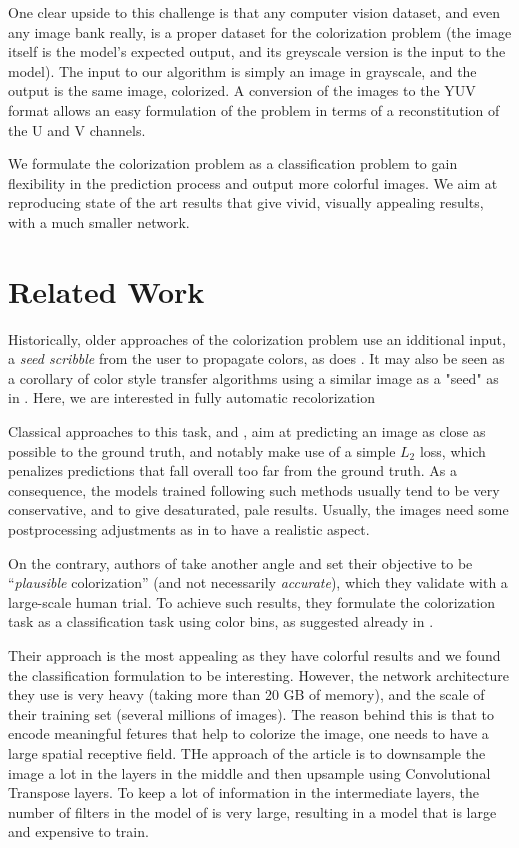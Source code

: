 \documentclass[10pt,twocolumn,letterpaper]{article}
\begin{document}
One clear upside to this challenge is that any computer vision dataset, and even any image bank really, is a proper dataset for the colorization problem (the image itself is the model's expected output, and its greyscale version is the input to the model).
The input to our algorithm is simply an image in grayscale, and the output is the same image, colorized. A conversion of the images to the YUV format allows an easy formulation of the problem in terms of a reconstitution of the U and V channels.

We formulate the colorization problem as a classification problem to gain flexibility in the prediction process and output more colorful images. We aim at reproducing state of the art results that give vivid, visually appealing results, with a much smaller network.

\section{Related Work} \label{relatedwork}

Historically, older approaches of the colorization problem use an idditional input, a \textit{seed scribble} from the user to propagate colors, as does \cite{levin2004colorization}. It may also be seen as a corollary of color style transfer algorithms using a similar image as a "seed" as in \cite{he2017neuralct}. Here, we are interested in fully automatic recolorization

Classical approaches to this task, \eg \cite{cheng2015deep} and \cite{dahl2016tinyclouds}, aim at predicting an image as close as possible to the ground truth, and notably make use of a simple $L_2$ loss, which penalizes predictions that fall overall too far from the ground truth. As a consequence, the models trained following such methods usually tend to be very conservative, and to give desaturated, pale results. Usually, the images need some postprocessing adjustments as in \cite{deshpande2015learning} to have a realistic aspect.

On the contrary, authors of \cite{zhang2016colorful} take another angle and set their objective to be ``\textit{plausible} colorization'' (and not necessarily \textit{accurate}), which they validate with a large-scale human trial. To achieve such results, they formulate the colorization task as a classification task using color bins, as suggested already in \cite{charpiat2008automatic}.

Their approach is the most appealing as they have colorful results and we found the classification formulation to be interesting. However, the network architecture they use is very heavy (taking more than 20 GB of memory), and the scale of their training set (several millions of images). The reason behind this is that to encode meaningful fetures that help to colorize the image, one needs to have a large spatial receptive field. THe approach of the article is to downsample the image a lot in the layers in the middle and then upsample using Convolutional Transpose layers. To keep a lot of information in the intermediate layers, the number of filters in the model of \cite{zhang2016colorful} is very large, resulting in a model that is large and expensive to train.
\end{document}
